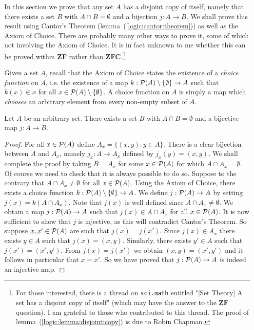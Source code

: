 In this section we prove that any set $A$ has a disjoint copy of
itself, namely that there exists a set $B$ with $A\cap B=\emptyset$
and a bijection $j:A\to B$. We shall prove this result using
Cantor's Theorem (lemma~(\ref{logic:cantor:theorem})) as well as the
Axiom of Choice. There are probably many other ways to prove it,
some of which not involving the Axiom of Choice. It is in fact
unknown to me whether this can be proved within {\bf ZF} rather than
{\bf ZFC}.\footnote{For those interested, there is a thread on
\texttt{sci.math} entitled "[Set Theory] A set has a disjoint copy
of itself" (which may have the answer to the {\bf ZF} question). I
am grateful to those who contributed to this thread. The proof of
lemma~(\ref{logic:lemma:disjoint:copy}) is due to Robin Chapman.}


Given a set $A$, recall that the Axiom of Choice states the
existence of a {\em choice function} on $A$, i.e. the existence of a
map $k:{\cal P}(A)\setminus\{\emptyset\}\to A$ such that $k(x)\in x$
for all $x\in{\cal P}(A)\setminus\{\emptyset\}$. A choice function
on $A$ is simply a map which {\em chooses} an arbitrary element from
every non-empty subset of $A$.

\begin{lemma}\label{logic:lemma:disjoint:copy}
Let $A$ be an arbitrary set. There exists a set $B$ with $A\cap
B=\emptyset$ and a bijective map $j:A\to B$.
\end{lemma}
\begin{proof}
For all $x\in {\cal P}(A)$ define $A_{x}=\{(x,y): y\in A\}$. There
is a clear bijection between $A$ and $A_{x}$, namely $j_{x}:A\to
A_{x}$ defined by $j_{x}(y)=(x,y)$. We shall complete the proof by
taking $B=A_{x}$ for some $x\in{\cal P}(A)$ for which $A\cap
A_{x}=\emptyset$. Of course we need to check that it is always
possible to do so. Suppose to the contrary that $A\cap
A_{x}\not=\emptyset$ for all $x\in{\cal P}(A)$. Using the Axiom of
Choice, there exists a choice function $k:{\cal
P}(A)\setminus\{\emptyset\}\to A$. We define $j:{\cal P}(A)\to A$ by
setting $j(x)=k(A\cap A_{x})$. Note that $j(x)$ is well defined
since $A\cap A_{x}\neq\emptyset$. We obtain a map $j:{\cal P}(A)\to
A$ such that $j(x)\in A\cap A_{x}$ for all $x\in {\cal P}(A)$. It is
now sufficient to show that $j$ is injective, as this will
contradict Cantor's Theorem. So suppose $x,x'\in{\cal P}(A)$ are
such that $j(x)=j(x')$. Since $j(x)\in A_{x}$ there exists $y\in A$
such that $j(x)=(x,y)$. Similarly, there exists $y'\in A$ such that
$j(x')=(x',y')$. From $j(x)=j(x')$ we obtain $(x,y)=(x',y')$ and it
follows in particular that $x=x'$. So we have proved that $j:{\cal
P}(A)\to A$ is indeed an injective map.
\end{proof}


